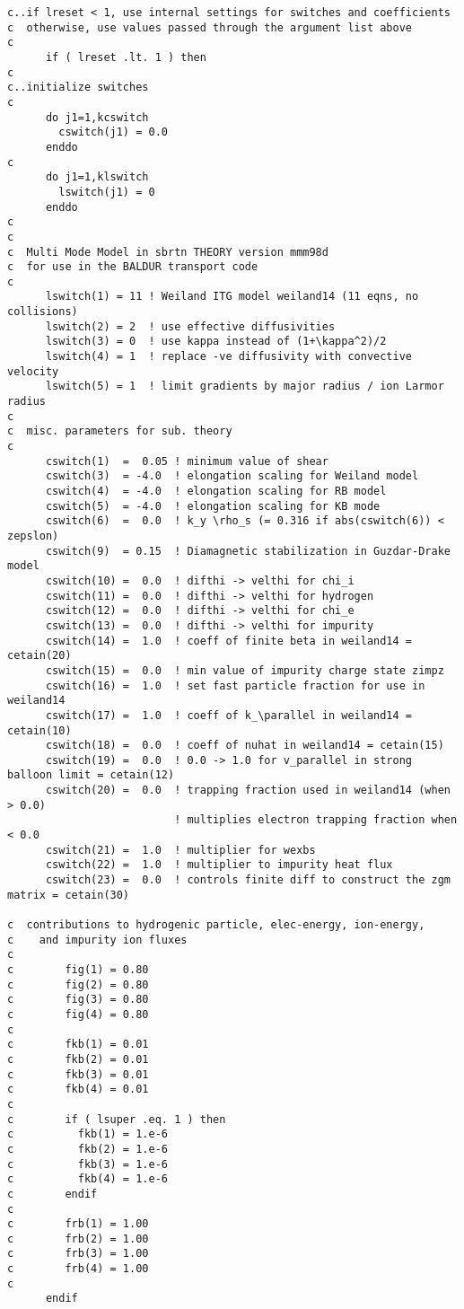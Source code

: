 \begin{verbatim}
c..if lreset < 1, use internal settings for switches and coefficients
c  otherwise, use values passed through the argument list above
c
      if ( lreset .lt. 1 ) then
c
c..initialize switches
c
      do j1=1,kcswitch
        cswitch(j1) = 0.0
      enddo
c
      do j1=1,klswitch
        lswitch(j1) = 0
      enddo
c
c
c  Multi Mode Model in sbrtn THEORY version mmm98d
c  for use in the BALDUR transport code
c
      lswitch(1) = 11 ! Weiland ITG model weiland14 (11 eqns, no collisions)
      lswitch(2) = 2  ! use effective diffusivities
      lswitch(3) = 0  ! use kappa instead of (1+\kappa^2)/2
      lswitch(4) = 1  ! replace -ve diffusivity with convective velocity
      lswitch(5) = 1  ! limit gradients by major radius / ion Larmor radius
c
c  misc. parameters for sub. theory
c
      cswitch(1)  =  0.05 ! minimum value of shear
      cswitch(3)  = -4.0  ! elongation scaling for Weiland model
      cswitch(4)  = -4.0  ! elongation scaling for RB model
      cswitch(5)  = -4.0  ! elongation scaling for KB mode
      cswitch(6)  =  0.0  ! k_y \rho_s (= 0.316 if abs(cswitch(6)) < zepslon)
      cswitch(9)  = 0.15  ! Diamagnetic stabilization in Guzdar-Drake model
      cswitch(10) =  0.0  ! difthi -> velthi for chi_i
      cswitch(11) =  0.0  ! difthi -> velthi for hydrogen
      cswitch(12) =  0.0  ! difthi -> velthi for chi_e
      cswitch(13) =  0.0  ! difthi -> velthi for impurity
      cswitch(14) =  1.0  ! coeff of finite beta in weiland14 = cetain(20)
      cswitch(15) =  0.0  ! min value of impurity charge state zimpz
      cswitch(16) =  1.0  ! set fast particle fraction for use in weiland14
      cswitch(17) =  1.0  ! coeff of k_\parallel in weiland14 = cetain(10)
      cswitch(18) =  0.0  ! coeff of nuhat in weiland14 = cetain(15)
      cswitch(19) =  0.0  ! 0.0 -> 1.0 for v_parallel in strong balloon limit = cetain(12)
      cswitch(20) =  0.0  ! trapping fraction used in weiland14 (when > 0.0)
                          ! multiplies electron trapping fraction when < 0.0
      cswitch(21) =  1.0  ! multiplier for wexbs 
      cswitch(22) =  1.0  ! multiplier to impurity heat flux
      cswitch(23) =  0.0  ! controls finite diff to construct the zgm matrix = cetain(30)

c  contributions to hydrogenic particle, elec-energy, ion-energy,
c    and impurity ion fluxes
c
c        fig(1) = 0.80
c        fig(2) = 0.80
c        fig(3) = 0.80
c        fig(4) = 0.80
c
c        fkb(1) = 0.01
c        fkb(2) = 0.01
c        fkb(3) = 0.01
c        fkb(4) = 0.01
c
c        if ( lsuper .eq. 1 ) then
c          fkb(1) = 1.e-6
c          fkb(2) = 1.e-6
c          fkb(3) = 1.e-6
c          fkb(4) = 1.e-6
c        endif
c
c        frb(1) = 1.00
c        frb(2) = 1.00
c        frb(3) = 1.00
c        frb(4) = 1.00
c
      endif

\end{verbatim}

